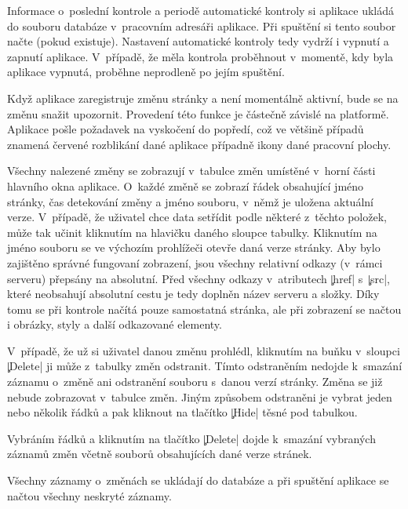 Informace o~poslední kontrole a periodě automatické kontroly si aplikace ukládá do souboru databáze v~pracovním adresáři aplikace.
Při spuštění si tento soubor načte (pokud existuje).
Nastavení automatické kontroly tedy vydrží i vypnutí a zapnutí aplikace.
V~případě, že měla kontrola proběhnout v~momentě, kdy byla aplikace vypnutá, proběhne neprodleně po jejím spuštění.

Když aplikace zaregistruje změnu stránky a není momentálně aktivní, bude se na změnu snažit upozornit.
Provedení této funkce je částečně závislé na platformě. 
Aplikace pošle požadavek na vyskočení do popředí, což ve většině případů znamená červené rozblikání dané aplikace případně ikony dané pracovní plochy.

Všechny nalezené změny se zobrazují v~tabulce změn umístěné v~horní části hlavního okna aplikace.
O~každé změně se zobrazí řádek obsahující jméno stránky, čas detekování změny a jméno souboru, v~němž je uložena aktuální verze.
V~případě, že uživatel chce data setřídit podle některé z~těchto položek, může tak učinit kliknutím na hlavičku daného sloupce tabulky.
Kliknutím na jméno souboru se ve výchozím prohlížeči otevře daná verze stránky.
Aby bylo zajištěno správné fungovaní zobrazení, jsou všechny relativní odkazy (v~rámci serveru) přepsány na absolutní.
Před všechny odkazy v~atributech \c|href| s~\c|src|, které neobsahují absolutní cestu je tedy doplněn název serveru a složky.
Díky tomu se při kontrole načítá pouze samostatná stránka, ale při zobrazení se načtou i obrázky, styly a další odkazované elementy.

V~případě, že už si uživatel danou změnu prohlédl, kliknutím na buňku v~sloupci \c|Delete| ji může z~tabulky změn odstranit.
Tímto odstraněním nedojde k~smazání záznamu o~změně ani odstranění souboru s~danou verzí stránky.
Změna se již nebude zobrazovat v~tabulce změn.
Jiným způsobem odstraněni je vybrat jeden nebo několik řádků a pak kliknout na tlačítko \c|Hide| těsné pod tabulkou.

Vybráním řádků a kliknutím na tlačítko \c|Delete| dojde k~smazání vybraných záznamů změn včetně souborů obsahujících dané verze stránek.

Všechny záznamy o~změnách se ukládají do databáze a při spuštění aplikace se načtou všechny neskryté záznamy. 
